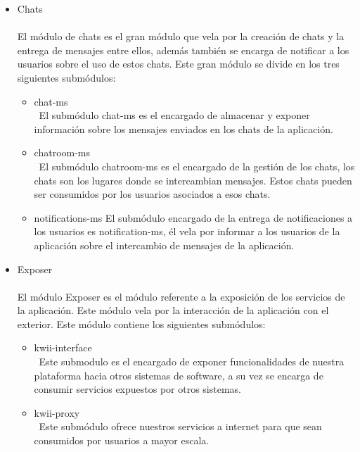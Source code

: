 \begin{itemize}
    \item Chats \\\\
    El módulo de chats es el gran módulo que vela por la creación de chats y la entrega de mensajes entre ellos, además también se encarga de notificar a los usuarios sobre el uso de estos chats. Este gran módulo se divide en los tres siguientes submódulos:
    \begin{itemize}
        \item chat-ms\\\
        El submódulo chat-ms es el encargado de almacenar y exponer información sobre los mensajes enviados en los chats de la aplicación.
        \item chatroom-ms\\\
        El submódulo chatroom-ms es el encargado de la gestión de los chats, los chats son los lugares donde se intercambian mensajes. Estos chats pueden ser consumidos por los usuarios asociados a esos chats.
        \item notifications-ms
        El submódulo encargado de la entrega de notificaciones a los usuarios es notification-ms, él vela por informar a los usuarios de la aplicación sobre el intercambio de mensajes de la aplicación.
    \end{itemize}

    \item Exposer\\\\
    El módulo Exposer es el módulo referente a la exposición de los servicios de la aplicación. Este módulo vela por la interacción de la aplicación con el exterior. Este módulo contiene los siguientes submódulos:
    \begin{itemize}
        \item kwii-interface\\\
        Este submodulo es el encargado de exponer funcionalidades de nuestra plataforma hacia otros sistemas de software,  a su vez se encarga de consumir servicios expuestos por otros sistemas.
        \item kwii-proxy\\\
        Este submódulo ofrece nuestros servicios a internet para que sean consumidos por usuarios a mayor escala.
    \end{itemize}


\end{itemize}
